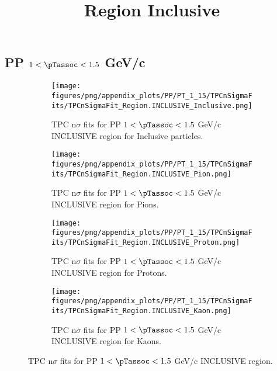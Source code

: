     
            \subsection*{PP $1 < \pTassoc < 1.5$ GeV/c}
            \begin{figure}[H]
                \title{Region Inclusive}
                \begin{subfigure}[b]{0.5\textwidth}
                    \centering
                    \texttt{[image: figures/png/appendix\_plots/PP/PT\_1\_15/TPCnSigmaFits/TPCnSigmaFit\_Region.INCLUSIVE\_Inclusive.png]}
                    \caption{TPC n$\sigma$ fits for PP $1 < \pTassoc < 1.5$ GeV/c INCLUSIVE region for Inclusive particles.}
                    \label{fig:appendix_PP_$1 < \pTassoc < 1.5$ GeV/c_INCLUSIVE_Inclusive}
                \end{subfigure}
                \begin{subfigure}[b]{0.5\textwidth}
                    \centering
                    \texttt{[image: figures/png/appendix\_plots/PP/PT\_1\_15/TPCnSigmaFits/TPCnSigmaFit\_Region.INCLUSIVE\_Pion.png]}
                    \caption{TPC n$\sigma$ fits for PP $1 < \pTassoc < 1.5$ GeV/c INCLUSIVE region for Pions.}
                    \label{fig:appendix_PP_$1 < \pTassoc < 1.5$ GeV/c_INCLUSIVE_Pion}
                \end{subfigure}
                \begin{subfigure}[b]{0.5\textwidth}
                    \centering
                    \texttt{[image: figures/png/appendix\_plots/PP/PT\_1\_15/TPCnSigmaFits/TPCnSigmaFit\_Region.INCLUSIVE\_Proton.png]}
                    \caption{TPC n$\sigma$ fits for PP $1 < \pTassoc < 1.5$ GeV/c INCLUSIVE region for Protons.}
                    \label{fig:appendix_PP_$1 < \pTassoc < 1.5$ GeV/c_INCLUSIVE_Proton}
                \end{subfigure}
                \begin{subfigure}[b]{0.5\textwidth}
                    \centering
                    \texttt{[image: figures/png/appendix\_plots/PP/PT\_1\_15/TPCnSigmaFits/TPCnSigmaFit\_Region.INCLUSIVE\_Kaon.png]}
                    \caption{TPC n$\sigma$ fits for PP $1 < \pTassoc < 1.5$ GeV/c INCLUSIVE region for Kaons.}
                    \label{fig:appendix_PP_$1 < \pTassoc < 1.5$ GeV/c_INCLUSIVE_Kaon}
                \end{subfigure}
                \caption{TPC n$\sigma$ fits for PP $1 < \pTassoc < 1.5$ GeV/c INCLUSIVE region.}
                \label{fig:appendix_PP_$1 < \pTassoc < 1.5$ GeV/c_INCLUSIVE}
            \end{figure}
